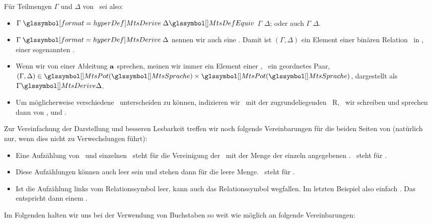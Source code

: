 Für Teilmengen $\Gamma$ und $\Delta$ von \MtsSprache\ sei also:
\begin{itemize}
	\item $\Gamma \defSymBin{\MtsDerive} \Delta \MtsDefEquiv$ $\Gamma$  $\Delta$; oder auch $\Gamma$  $\Delta$.
	\item $\Gamma \defSymBin{\MtsDerive} \Delta$ nennen wir auch eine   \MtsSprache.
	Damit ist $(\Gamma,\Delta)$ ein Element einer binären Relation \MtsDerive\ in \MtsPotSprache, einer sogenannten .
	\item Wenn wir von einer Ableitung $\mathbf{a}$ sprechen, meinen wir immer ein Element einer \Ableitungsrelation, \textdh\ ein geordnetes Paar, \textzB\ $(\Gamma, \Delta) \in \MtsPotSprache \times \MtsPotSprache$, dargestellt als $\Gamma \MtsDerive \Delta$.
	\item Um möglicherweise verschiedene \Ableitungsrelationen\ unterscheiden zu können, indizieren wir  \textggf\ mit der zugrundeliegenden \Relation\ R, \textdh\ wir schreiben  und sprechen dann von ,  und .
\end{itemize}
%
Zur Vereinfachung der Darstellung und besseren Lesbarkeit treffen wir noch folgende Vereinbarungen für die beiden Seiten von \seqqt{$\Gamma \MtsDerive \Delta$} (natürlich nur, wenn dies nicht zu Verwechslungen führt):
\begin{itemize}
	\item Eine Aufzählung von \Formelmengen\ und einzelnen \Formeln\ steht für die Vereinigung der \Formelmengen\ mit der Menge der einzeln angegebenen \Formeln.
	\textZB\ steht \seqqt{$\Gamma, \alpha \MtsDerive \beta$} für \seqqt{$(\Gamma \cup \{\alpha\}) \MtsDerive \{\beta\}$}.
	\item Diese Aufzählungen können auch leer sein und stehen dann für die leere Menge. \textZB\ steht \seqqt{$\MtsDerive\; \alpha \FrmImp (\beta \FrmImp \alpha)$} für \seqqt{$\emptyset \MtsDerive \{\alpha \FrmImp (\beta \FrmImp \alpha)\}$}.
	\item Ist die Aufzählung links vom Relationssymbol \chrqt{\MtsDerive} leer, kann auch das Relationssymbol wegfallen.
	Im letzten Beispiel also einfach \seqqt{$\{\alpha \FrmImp (\beta \FrmImp \alpha)\}$}.
	Das entspricht dann einem .
\end{itemize}
%
Im Folgenden halten wir uns bei der Verwendung von Buchstaben so weit wie möglich an folgende Vereinbarungen:%
